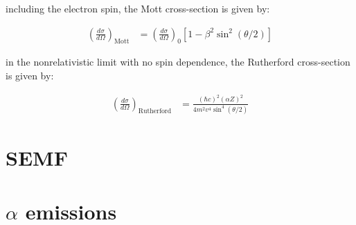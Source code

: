 \documentclass[10pt]{article}
\theoremstyle{definition}
\begin{document}
including the electron spin, the Mott cross-section is given by:

\begin{align*}
    \left(\frac{d\sigma}{d\Omega}\right)_{\text{Mott}} &=
    \left(\frac{d\sigma}{d\Omega}\right)_0 [1-\beta^2\sin^2(\theta/2)]
\end{align*}

in the nonrelativistic limit with no spin dependence, the Rutherford cross-section is given by:

\begin{align*}
    \left(\frac{d\sigma}{d\Omega}\right)_{\text{Rutherford}} &=
    \frac{(\hbar c)^2 (\alpha Z)^2}{4m^2 v^4 \sin^4(\theta/2)}
\end{align*}


\section*{SEMF}%


\section*{$\alpha$ emissions}%
\end{document}
